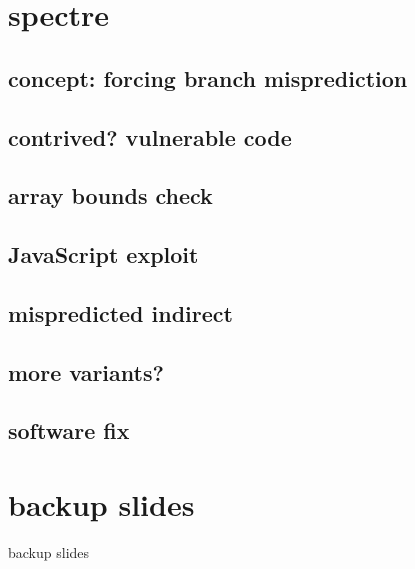 \section{spectre}

\subsection{concept: forcing branch misprediction}


\subsection{contrived? vulnerable code}


\subsection{array bounds check}


\subsection{JavaScript exploit}


\subsection{mispredicted indirect}


\subsection{more variants?}


\subsection{software fix}


\section{backup slides}
\begin{frame}{backup slides}
\end{frame}
